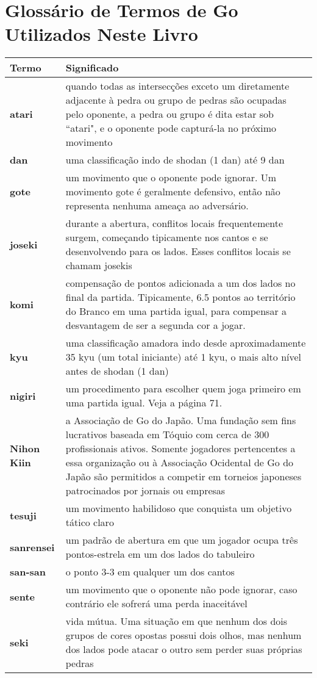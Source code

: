 \chapter{Glossário de Termos de Go Utilizados Neste Livro}

\begin{longtable}{l|p{80mm}} 
 \hline
 \textbf{Termo} & \textbf{Significado} \\
 \hline \hline
 \textbf{atari} & quando todas as intersecções exceto um diretamente adjacente à pedra ou grupo de pedras são ocupadas pelo oponente, a pedra ou grupo é dita estar sob ``atari", e o oponente pode capturá-la no próximo movimento \\ 
 \hline
 \textbf{dan} & uma classificação indo de shodan (1 dan) até 9 dan \\
 \hline
 \textbf{gote} & um movimento que o oponente pode ignorar. Um movimento gote é geralmente defensivo, então não representa nenhuma ameaça ao adversário. \\
 \hline
 \textbf{joseki} & durante a abertura, conflitos locais frequentemente surgem, começando tipicamente nos cantos e se desenvolvendo para os lados. Esses conflitos locais se chamam josekis \\
 \hline
 \textbf{komi} & compensação de pontos adicionada a um dos lados no final da partida. Tipicamente, 6.5 pontos ao território do Branco em uma partida igual, para compensar a desvantagem de ser a segunda cor a jogar. \\
 \hline
 \textbf{kyu} & uma classificação amadora indo desde aproximadamente 35 kyu (um total iniciante) até 1 kyu, o mais alto nível antes de shodan (1 dan) \\
 \hline
 \textbf{nigiri} & um procedimento para escolher quem joga primeiro em uma partida igual. Veja a página 71. \\
 \hline
 \textbf{Nihon Kiin} & a Associação de Go do Japão. Uma fundação sem fins lucrativos baseada em Tóquio com cerca de 300 profissionais ativos. Somente jogadores pertencentes a essa organização ou à Associação Ocidental de Go do Japão são permitidos a competir em torneios japoneses patrocinados por jornais ou empresas \\
 \hline
 \textbf{tesuji} & um movimento habilidoso que conquista um objetivo tático claro \\
 \hline
 \textbf{sanrensei} & um padrão de abertura em que um jogador ocupa três pontos-estrela em um dos lados do tabuleiro \\
 \hline
 \textbf{san-san} & o ponto 3-3 em qualquer um dos cantos \\
 \hline
 \textbf{sente} & um movimento que o oponente não pode ignorar, caso contrário ele sofrerá uma perda inaceitável \\
 \hline
 \textbf{seki} & vida mútua. Uma situação em que nenhum dos dois grupos de cores opostas possui dois olhos, mas nenhum dos lados pode atacar o outro sem perder suas próprias pedras \\
 \hline
\end{longtable}